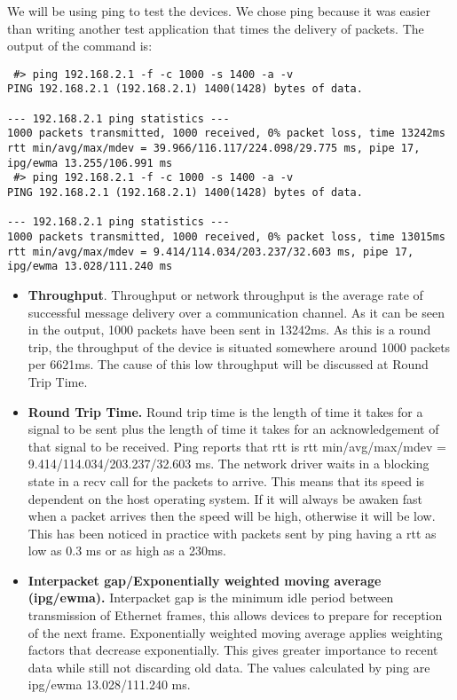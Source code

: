 We will be using ping to test the devices. We chose ping because it was easier than writing another test application
that times the delivery of packets. The output of the command is:
\lstset{language=zsh,caption=,label=lst:pingout}
\begin{lstlisting}
 #> ping 192.168.2.1 -f -c 1000 -s 1400 -a -v
PING 192.168.2.1 (192.168.2.1) 1400(1428) bytes of data.
                 
--- 192.168.2.1 ping statistics ---
1000 packets transmitted, 1000 received, 0% packet loss, time 13242ms
rtt min/avg/max/mdev = 39.966/116.117/224.098/29.775 ms, pipe 17, ipg/ewma 13.255/106.991 ms
 #> ping 192.168.2.1 -f -c 1000 -s 1400 -a -v
PING 192.168.2.1 (192.168.2.1) 1400(1428) bytes of data.
                 
--- 192.168.2.1 ping statistics ---
1000 packets transmitted, 1000 received, 0% packet loss, time 13015ms
rtt min/avg/max/mdev = 9.414/114.034/203.237/32.603 ms, pipe 17, ipg/ewma 13.028/111.240 ms
\end{lstlisting}

\begin{itemize}
  \item \textbf{Throughput}. Throughput or network throughput is the average rate of successful message delivery 
over a communication channel. As it can be seen in the output, 1000 packets have been sent in 13242ms. As this
is a round trip, the throughput of the device is situated somewhere around 1000 packets per 6621ms. The cause of this
low throughput will be discussed at Round Trip Time.
  \item \textbf{Round Trip Time.}  Round trip time is the length of time it takes for a signal to be sent plus the 
length of time it takes for an acknowledgement of that signal to be received. Ping reports that rtt is
rtt min/avg/max/mdev = 9.414/114.034/203.237/32.603 ms. The network driver waits in a blocking state in a recv
call for the packets to arrive. This means that its speed is dependent on the host operating system. If it will
always be awaken fast when a packet arrives then the speed will be high, otherwise it will be low. This has been
noticed in practice with packets sent by ping having a rtt as low as 0.3 ms or as high as a 230ms.
  \item \textbf{Interpacket gap/Exponentially weighted moving average (ipg/ewma).} Interpacket gap is the minimum idle period
between transmission of Ethernet frames, this allows devices to prepare for reception of the next frame. Exponentially weighted moving
average applies weighting factors that decrease exponentially. This gives greater importance to recent data while still not discarding
old data. The values calculated by ping are ipg/ewma 13.028/111.240 ms.
\end{itemize}


